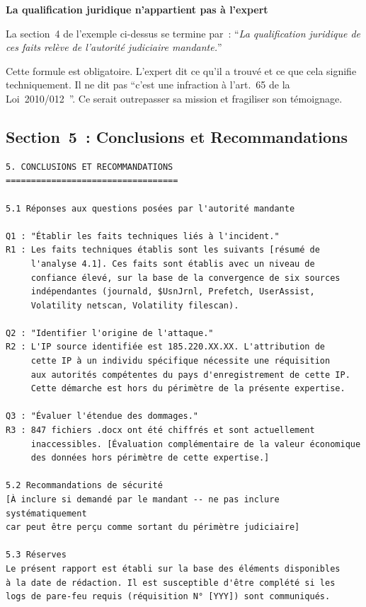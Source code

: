 \begin{boxalert}
\textbf{La qualification juridique n'appartient pas à l'expert}

La section~4 de l'exemple ci-dessus se termine par~:
``\textit{La qualification juridique de ces faits relève de
l'autorité judiciaire mandante.}''

Cette formule est obligatoire. L'expert dit ce qu'il a trouvé
et ce que cela signifie techniquement. Il ne dit pas ``c'est
une infraction à l'art.~65 de la Loi~2010/012~\cite{cameroun2010a}''. Ce serait
outrepasser sa mission et fragiliser son témoignage.
\end{boxalert}

\subsection{Section~5~: Conclusions et Recommandations}

\begin{lstlisting}[language=bash_forensique,
    caption={Section Conclusions -- synthèse et recommandations}]
5. CONCLUSIONS ET RECOMMANDATIONS
==================================

5.1 Réponses aux questions posées par l'autorité mandante

Q1 : "Établir les faits techniques liés à l'incident."
R1 : Les faits techniques établis sont les suivants [résumé de
     l'analyse 4.1]. Ces faits sont établis avec un niveau de
     confiance élevé, sur la base de la convergence de six sources
     indépendantes (journald, $UsnJrnl, Prefetch, UserAssist,
     Volatility netscan, Volatility filescan).

Q2 : "Identifier l'origine de l'attaque."
R2 : L'IP source identifiée est 185.220.XX.XX. L'attribution de
     cette IP à un individu spécifique nécessite une réquisition
     aux autorités compétentes du pays d'enregistrement de cette IP.
     Cette démarche est hors du périmètre de la présente expertise.

Q3 : "Évaluer l'étendue des dommages."
R3 : 847 fichiers .docx ont été chiffrés et sont actuellement
     inaccessibles. [Évaluation complémentaire de la valeur économique
     des données hors périmètre de cette expertise.]

5.2 Recommandations de sécurité
[À inclure si demandé par le mandant -- ne pas inclure systématiquement
car peut être perçu comme sortant du périmètre judiciaire]

5.3 Réserves
Le présent rapport est établi sur la base des éléments disponibles
à la date de rédaction. Il est susceptible d'être complété si les
logs de pare-feu requis (réquisition N° [YYY]) sont communiqués.
\end{lstlisting}

